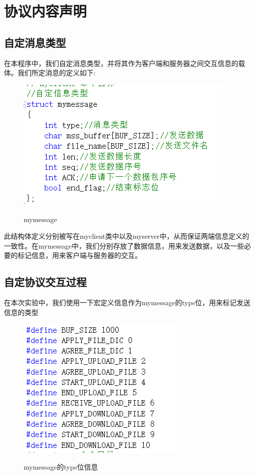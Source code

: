 \section{协议内容声明}

\subsection{自定消息类型}
在本程序中，我们自定消息类型，并将其作为客户端和服务器之间交互信息的载体。我们所定消息的定义如下:

\begin{figure}[H]
  \centering
  \includegraphics[width=0.8\linewidth]{figure/mymessage}\\
  \caption{mymessage}
\end{figure}

此结构体定义分别被写在myclient类中以及myserver中，从而保证两端信息定义的一致性。在mymessage中，我们分别存放了数据信息，用来发送数据，以及一些必要的标记信息，用来客户端与服务器的交互。
\subsection{自定协议交互过程}

在本次实验中，我们使用一下宏定义信息作为mymessage的type位，用来标记发送信息的类型
\begin{figure}[H]
  \centering
  \includegraphics[width=0.8\linewidth]{figure/type}\\
  \caption{mymessage的type位信息}
\end{figure}

